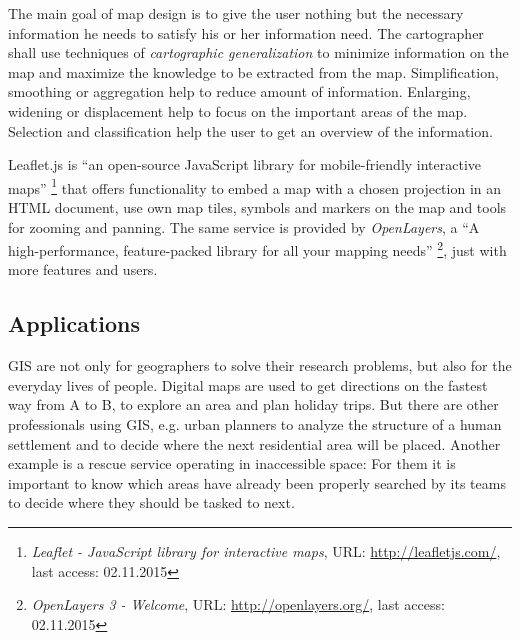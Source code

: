 The main goal of map design is to give the user nothing but the necessary information he needs to satisfy his or her information need. The cartographer shall use techniques of \emph{cartographic generalization} to minimize information on the map and maximize the knowledge to be extracted from the map. Simplification, smoothing or aggregation help to reduce amount of information. Enlarging, widening or displacement help to focus on the important areas of the map. Selection and classification help the user to get an overview of the information.
\cite{krygier2005making}

Leaflet.js is ``an open-source JavaScript library for mobile-friendly interactive maps''
\footnote{
  \textit{Leaflet - JavaScript library for interactive maps},
  URL: \url{http://leafletjs.com/},
  last access: 02.11.2015
}
that offers functionality to embed a map with a chosen projection in an HTML document, use own map tiles, symbols and markers on the map and tools for zooming and panning.
The same service is provided by \emph{OpenLayers}, a ``A high-performance, feature-packed library for all your mapping needs''
\footnote{
  \textit{OpenLayers 3 - Welcome},
  URL: \url{http://openlayers.org/},
  last access: 02.11.2015
}, just with more features and users.




\subsection{Applications} %
\label{ssub:gis_applications}

GIS are not only for geographers to solve their research problems, but also for the everyday lives of people. Digital maps are used to get directions on the fastest way from A to B, to explore an area and plan holiday trips. But there are other professionals using GIS, e.g. urban planners to analyze the structure of a human settlement and to decide where the next residential area will be placed. Another example is a rescue service operating in inaccessible space: For them it is important to know which areas have already been properly searched by its teams to decide where they should be tasked to next.


